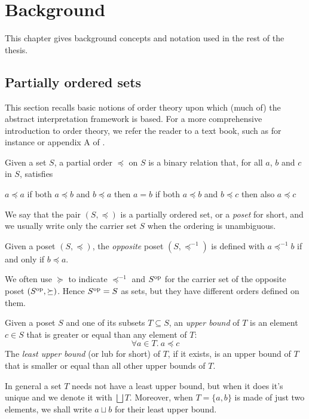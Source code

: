\chapter{Background}\label{ch2:background}
This chapter gives background concepts and notation used in the rest of the thesis.

\section{Partially ordered sets}
This section recalls basic notions of order theory upon which (much of) the abstract interpretation framework is based. For a more comprehensive introduction to order theory, we refer the reader to a text book, such as for instance \cite{order-theory-book} or appendix A of \cite{principles-of-program-analysis-book}.

\begin{definition}
	Given a set $S$, a partial order $\preceq$ on $S$ is a binary relation that, for all $a$, $b$ and $c$ in $S$, satisfies
	\begin{itemize}
		 $a \preceq a$
		 if both $a \preceq b$ and $b \preceq a$ then $a = b$
		 if both $a \preceq b$ and $b \preceq c$ then also $a \preceq c$
	\end{itemize}
\end{definition}
We say that the pair $(S, \preceq)$ is a partially ordered set, or a \textit{poset} for short, and we usually write only the carrier set $S$ when the ordering is unambiguous.

\begin{definition}
	Given a poset $(S, \preceq)$, the \textit{opposite} poset $(S, \preceq^{-1})$ is defined with $a \preceq^{-1} b$ if and only if $b \preceq a$.
\end{definition}
We often use $\succeq$ to indicate $\preceq^{-1}$ and $S^{\text{op}}$ for the carrier set of the opposite poset $(S^{\text{op}}, \succeq)$. Hence $S^{\text{op}} = S$ as sets, but they have different orders defined on them.

\begin{definition}
	Given a poset $S$ and one of its subsets $T \subseteq S$, an \textit{upper bound} of $T$ is an element $c \in S$ that is greater or equal than any element of $T$:
	\[
	\forall a \in T.\ a \preceq c
	\]
	The \textit{least upper bound} (or lub for short) of $T$, if it exists, is an upper bound of $T$ that is smaller or equal than all other upper bounds of $T$.
\end{definition}
In general a set $T$ needs not have a least upper bound, but when it does it's unique and we denote it with $\bigsqcup T$. Moreover, when $T = \{ a, b \}$ is made of just two elements, we shall write $a \sqcup b$ for their least upper bound.

